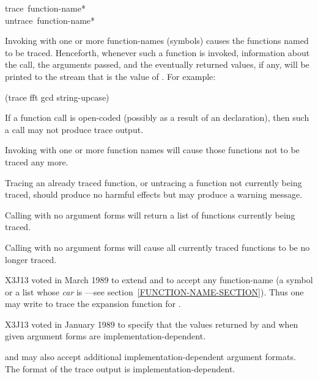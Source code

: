 \begin{defmac}
trace {\,function-name}* \\
untrace {\,function-name}*

\begin{obsolete}\noindent
Invoking  with one or more function-names (symbols) causes
the functions named to be traced.  Henceforth, whenever such
a function is invoked, information about the call, the arguments
passed, and the eventually returned values, if any, will be printed
to the stream that is the value of .
For example:
\end{obsolete}
\begin{lisp}
(trace fft gcd string-upcase)
\end{lisp}
If a function call is open-coded (possibly as a result of an 
declaration), then such a call may not produce trace output.

Invoking  with one or more function names will cause those
functions not to be traced any more.

Tracing an already traced function, or untracing a function not
currently being traced, should produce no harmful effects but may
produce a warning message.

Calling  with no argument forms will return a list of functions
currently being traced.

Calling  with no argument forms will cause all currently
traced functions to be no longer traced.

\begin{newer}
X3J13 voted in March 1989  to extend 
and 
to accept any function-name (a symbol or a list
whose {\it car} is ---see section~\ref{FUNCTION-NAME-SECTION}).
Thus one may write  to trace the 
expansion function for .
\end{newer}

\begin{new}
X3J13 voted in January 1989
to specify that the values returned by  and  when
given argument forms are implementation-dependent.
\end{new}

 and  may also accept additional
implementation-dependent argument formats.  The format of the trace
output is implementation-dependent.
\end{defmac}


